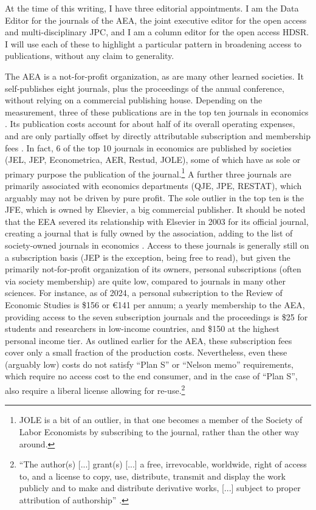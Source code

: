 \documentclass{article}
\begin{document}
At the time of this writing, I have three editorial appointments. I am the Data Editor for the journals of the \acf{AEA}, the joint executive editor for the open access and multi-disciplinary \ac{JPC}, and I am a column editor for the open access \ac{HDSR}. I will use each of these to highlight a particular pattern in broadening access to publications, without any claim to generality. 

The \ac{AEA} is a not-for-profit organization, as are many other learned societies. It self-publishes eight journals, plus the proceedings of the annual conference, without relying on a commercial publishing house. Depending on the measurement, three of these publications are in the top ten journals in economics \citep{mogstad_statistical_2022-1}. Its publication costs account for about half of its overall operating expenses, and are only partially offset by directly attributable subscription and membership fees \citep{cherry_bekaert_llp_american_2024}. In fact, 6 of the top 10 journals in economics \citep{mogstad_statistical_2022-1} are published by societies (JEL, JEP, Econometrica, AER, Restud, JOLE), some of which have as sole or primary purpose the publication of the journal.\footnote{JOLE is a bit of an outlier, in that one becomes a member of the Society of Labor Economists by subscribing to the journal, rather than the other way around.} A further three journals are primarily associated with economics departments (QJE, JPE, RESTAT), which arguably may not be driven by pure profit. The sole outlier in the top ten is the \ac{JFE}, which is owned by Elsevier, a big commercial publisher. It should be noted that the \ac{EEA} severed its relationship with Elsevier in 2003 for its official journal, creating a journal that is fully owned by the association, adding to the list of society-owned journals in economics \citep{tirole_editorial_2003}. Access to these journals is generally still on a subscription basis (JEP is the exception, being free to read), but given the primarily not-for-profit organization of its owners, personal subscriptions (often via society membership) are quite low, compared to journals in many other sciences. For instance, as of 2024, a personal subscription to the Review of Economic Studies is \$156 or €141 per annum; a yearly membership to the \ac{AEA}, providing access to the seven subscription journals and the proceedings is \$25 for students and researchers in low-income countries, and \$150 at the highest personal income tier. As outlined earlier for the AEA, these subscription fees cover only a small fraction of the production costs. Nevertheless, even these (arguably low) costs do not satisfy ``Plan S'' or ``Nelson memo'' requirements, which require no access cost to the end consumer, and in the case of ``Plan S'', also require a liberal license allowing for re-use.\footnote{``The author(s) [...] grant(s) [...] a free, irrevocable, worldwide, right of access to, and a license to copy, use, distribute, transmit and display the work publicly and to make and distribute derivative works, [...] subject to proper attribution of authorship'' \citep{max-planck-gesellschaft_berlin_2023}. }
\end{document}
